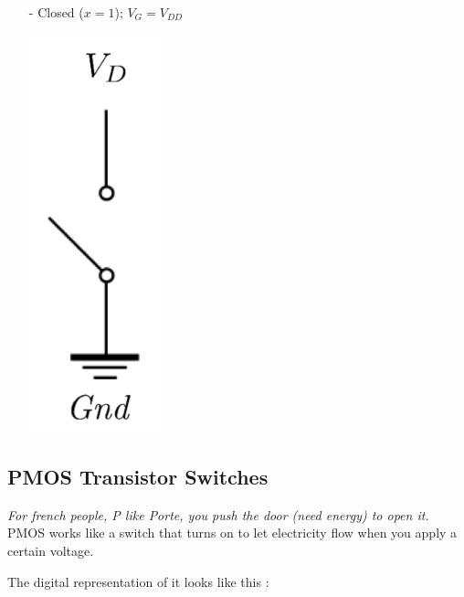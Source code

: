 \documentclass[12pt,openany, tikz,border=10pt]{book}
\begin{document}
\begin{itemize}
     
        \item[-] Closed ($x=1$); $V_{G} = V_{DD}$
        \newline
        \noindent\begin{minipage}{0.5\textwidth}
        \end{minipage}%
        \begin{minipage}{0.30\textwidth}
            \centering
            \includegraphics[width=0.30\textwidth]{circuits/9.1.1_3.png} %
        \end{minipage}
    \end{itemize}


    \subsection{PMOS Transistor Switches}
    \textit{For french people, P like Porte, you push the door (need energy) to open it.}
    \newline PMOS works like a switch that turns on to let electricity flow when you apply a certain voltage.

    The digital representation of it looks like this :
\end{document}
